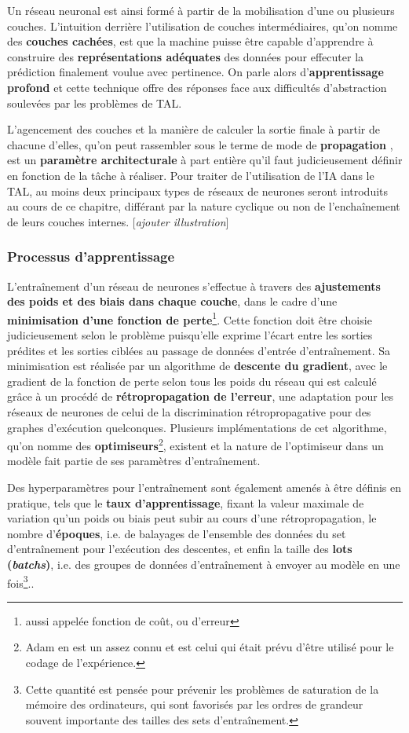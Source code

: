 \documentclass[12pt, french, twoside]{report}
\begin{document}
Un réseau neuronal est ainsi formé à partir de la mobilisation d'une ou plusieurs couches. L'intuition derrière l'utilisation de couches intermédiaires, qu'on nomme des \textbf{couches cachées}, est que la machine puisse être capable d'apprendre à construire des \textbf{représentations adéquates} des données pour effecuter la prédiction finalement voulue avec pertinence. On parle alors d'\textbf{apprentissage profond} et cette technique offre des réponses face aux difficultés d'abstraction soulevées par les problèmes de TAL.

L'agencement des couches et la manière de calculer la sortie finale à partir de chacune d'elles, qu'on peut rassembler sous le terme de \og mode de \textbf{propagation} \fg, est un \textbf{paramètre architecturale} à part entière qu'il faut judicieusement définir en fonction de la tâche à réaliser. Pour traiter de l'utilisation de l'IA dans le TAL, au moins deux principaux types de réseaux de neurones seront introduits au cours de ce chapitre, différant par la nature cyclique ou non de l'enchaînement de leurs couches internes.\cite[introduction + section 3]{jurafsky_ffnn} [\textit{ajouter illustration}]

\subsubsection{Processus d'apprentissage}
L'entraînement d'un réseau de neurones s'effectue à travers des \textbf{ajustements des poids et des biais dans chaque couche}, dans le cadre d'une \textbf{minimisation d'une fonction de perte}\footnote{aussi appelée fonction de coût, ou d'erreur}. Cette fonction doit être choisie judicieusement selon le problème puisqu'elle exprime l'écart entre les sorties prédites et les sorties ciblées au passage de données d'entrée d'entraînement. Sa minimisation est réalisée par un algorithme de \textbf{descente du gradient}, avec le gradient de la fonction de perte selon tous les poids du réseau qui est calculé grâce à un procédé de \textbf{rétropropagation de l'erreur}, une adaptation pour les réseaux de neurones de celui de la discrimination rétropropagative pour des graphes d'exécution quelconques. Plusieurs implémentations de cet algorithme, qu'on nomme des \textbf{optimiseurs}\footnote{Adam\cite{kingma2017adam} en est un assez connu et est celui qui était prévu d'être utilisé pour le codage de l'expérience.}, existent et la nature de l'optimiseur dans un modèle fait partie de ses paramètres d'entraînement.

Des hyperparamètres pour l'entraînement sont également amenés à être définis en pratique, tels que le \textbf{taux d'apprentissage}, fixant la valeur maximale de variation qu'un poids ou biais peut subir au cours d'une rétropropagation, le nombre d'\textbf{époques}, i.e. de balayages de l'ensemble des données du set d'entraînement pour l'exécution des descentes, et enfin la taille des \textbf{lots (\textit{batchs})}, i.e. des groupes de données d'entraînement à envoyer au modèle en une fois\footnote{Cette quantité est pensée pour prévenir les problèmes de saturation de la mémoire des ordinateurs, qui sont favorisés par les ordres de grandeur souvent importante des tailles des sets d'entraînement.}.\cite[17-23]{jurafsky_ffnn}.\cite[21]{fourrier}
\end{document}
